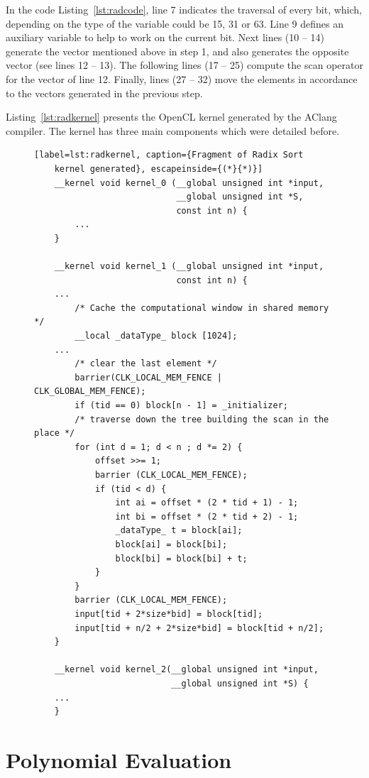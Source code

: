 \documentclass[Ingles]{ic-tese-v1}
\newcommand{\rlst}[1]{Listing~\ref{lst:#1}}
\begin{document}
In the code \rlst{radcode}, line 7 indicates the traversal of  every bit,
which, depending on the type of the variable could be 15, 31 or 63. Line 9
defines an auxiliary variable to help to work on  the current bit. Next lines
(10 -- 14) generate the vector mentioned above in step 1, and also
generates the opposite vector (see lines 12 -- 13).  The following lines (17 --
25) compute the scan operator for the vector of line 12. Finally, lines (27
-- 32) move the elements in accordance to the vectors generated in the previous
step.

\rlst{radkernel} presents the OpenCL kernel generated by the AClang compiler.
The kernel has three main components which were detailed before.

\begin{figure}[t]
	\lstset{basicstyle=\scriptsize}
	\begin{lstlisting}[label=lst:radkernel, caption={Fragment of Radix Sort
	kernel generated}, escapeinside={(*}{*)}]
	__kernel void kernel_0 (__global unsigned int *input,
	                        __global unsigned int *S,
	                        const int n) {
		...
	}

	__kernel void kernel_1 (__global unsigned int *input,
	                        const int n) {
    ...
 	    /* Cache the computational window in shared memory */
 	    __local _dataType_ block [1024];
    ...
	    /* clear the last element */
	    barrier(CLK_LOCAL_MEM_FENCE | CLK_GLOBAL_MEM_FENCE);
	    if (tid == 0) block[n - 1] = _initializer;
	    /* traverse down the tree building the scan in the place */
	    for (int d = 1; d < n ; d *= 2) {
		    offset >>= 1;
		    barrier (CLK_LOCAL_MEM_FENCE);
		    if (tid < d) {
			    int ai = offset * (2 * tid + 1) - 1;
			    int bi = offset * (2 * tid + 2) - 1;
			    _dataType_ t = block[ai];
			    block[ai] = block[bi];
			    block[bi] = block[bi] + t;
		    }
	    }
	    barrier (CLK_LOCAL_MEM_FENCE);
	    input[tid + 2*size*bid] = block[tid];
	    input[tid + n/2 + 2*size*bid] = block[tid + n/2];
	}

	__kernel void kernel_2(__global unsigned int *input,
	                       __global unsigned int *S) {
    ...
	}
	\end{lstlisting}
\end{figure}

\section{Polynomial Evaluation}
\label{sec:PolEval}
\end{document}
